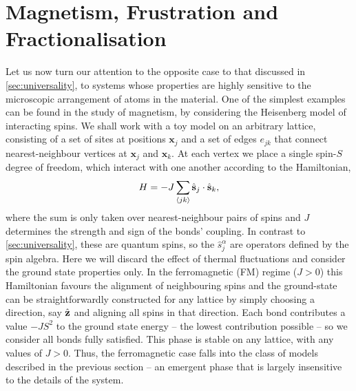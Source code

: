 \section{Magnetism, Frustration and Fractionalisation}\label{sec:lattice_specific}

Let us now turn our attention to the opposite case to that discussed in \textsection\ref{sec:universality}, to systems whose properties are highly sensitive to the microscopic arrangement of atoms in the material. One of the simplest examples can be found in the study of magnetism, by considering the Heisenberg model of interacting spins. We shall work with a toy model on an arbitrary lattice, consisting of a set of sites at positions $ \textbf{x}_j $ and a set of edges $e_{jk}$ that connect nearest-neighbour vertices at $ \textbf{x}_j $ and $ \textbf{x}_k$. At each vertex we place a single spin-$S$ degree of freedom, which interact with one another according to the Hamiltonian,
\begin{align} \label{eqn:heisenberg_model}
    H = - J \sum_{\braket{jk}} \hat{\textbf{s}}_j \cdot \hat {\textbf{s}}_k,
\end{align}
where the sum is only taken over nearest-neighbour pairs of spins and $J$ determines the strength and sign of the bonds' coupling. In contrast to \textsection\ref{sec:universality}, these are quantum spins, so the $\hat s^\alpha_j$ are operators defined by the spin algebra. Here we will discard the effect of thermal fluctuations and consider the ground state properties only. In the ferromagnetic (FM) regime ($J > 0$) this Hamiltonian favours the alignment of neighbouring spins and the ground-state can be straightforwardly constructed for any lattice by simply choosing a direction, say $\hat {\textbf z}$ and aligning all spins in that direction. Each bond contributes a value $-JS^2$ to the ground state energy -- the lowest contribution possible -- so we consider all bonds fully satisfied. This phase is stable on any lattice, with any values of $J>0$. Thus, the ferromagnetic case falls into the class of models described in the previous section -- an emergent phase that is largely insensitive to the details of the system. 

